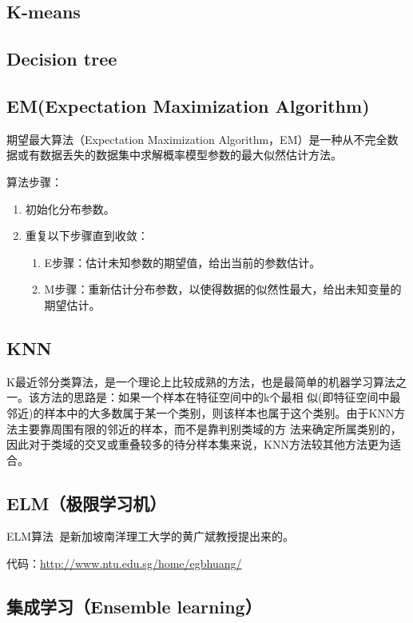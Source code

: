 \documentclass[12pt]{article}
\begin{document}
\subsection{K-means}

\subsection{Decision tree}

\subsection{EM(Expectation Maximization Algorithm)}
期望最大算法（Expectation Maximization Algorithm，EM）是一种从不完全数据或有数据丢失的数据集中求解概率模型参数的最大似然估计方法。

{\color{blue}算法步骤}：
\begin{enumerate}
    \item 初始化分布参数。
    \item 重复以下步骤直到收敛：
        \begin{enumerate}
            \item E步骤：估计未知参数的期望值，给出当前的参数估计。
            \item M步骤：重新估计分布参数，以使得数据的似然性最大，给出未知变量的期望估计。
        \end{enumerate}
\end{enumerate}

\subsection{KNN}

K最近邻分类算法，是一个理论上比较成熟的方法，也是最简单的机器学习算法之一。该方法的思路是：如果一个样本在特征空间中的k个最相 似(即特征空间中最邻近)的样本中的大多数属于某一个类别，则该样本也属于这个类别。由于KNN方法主要靠周围有限的邻近的样本，而不是靠判别类域的方 法来确定所属类别的，因此对于类域的交叉或重叠较多的待分样本集来说，KNN方法较其他方法更为适合。

\subsection{ELM（极限学习机）}

ELM算法~\cite{huang2004extreme}是新加坡南洋理工大学的黄广斌教授提出来的。

{\color{blue}代码}：\url{http://www.ntu.edu.sg/home/egbhuang/}

\subsection{集成学习（Ensemble learning）}
\end{document}
